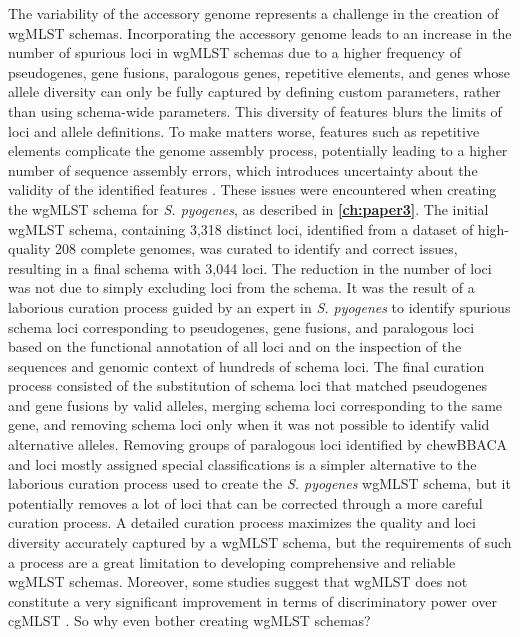 The variability of the accessory genome represents a challenge in the creation of \ac{wgMLST} schemas. Incorporating the accessory genome leads to an increase in the number of spurious loci in \ac{wgMLST} schemas due to a higher frequency of pseudogenes, gene fusions, paralogous genes, repetitive elements, and genes whose allele diversity can only be fully captured by defining custom parameters, rather than using schema-wide parameters. This diversity of features blurs the limits of loci and allele definitions. To make matters worse, features such as repetitive elements complicate the genome assembly process, potentially leading to a higher number of sequence assembly errors, which introduces uncertainty about the validity of the identified features \cite{merda_unraveling_2024, wick_unicycler_2017}. These issues were encountered when creating the \ac{wgMLST} schema for \textit{S. pyogenes}, as described in \textbf{\autoref{ch:paper3}}. The initial \ac{wgMLST} schema, containing 3,318 distinct loci, identified from a dataset of high-quality 208 complete genomes, was curated to identify and correct issues, resulting in a final schema with 3,044 loci. The reduction in the number of loci was not due to simply excluding loci from the schema. It was the result of a laborious curation process guided by an expert in \textit{S. pyogenes} to identify spurious schema loci corresponding to pseudogenes, gene fusions, and paralogous loci based on the functional annotation of all loci and on the inspection of the sequences and genomic context of hundreds of schema loci. The final curation process consisted of the substitution of schema loci that matched pseudogenes and gene fusions by valid alleles, merging schema loci corresponding to the same gene, and removing schema loci only when it was not possible to identify valid alternative alleles. Removing groups of paralogous loci identified by chewBBACA and loci mostly assigned special classifications is a simpler alternative to the laborious curation process used to create the \textit{S. pyogenes} \ac{wgMLST} schema, but it potentially removes a lot of loci that can be corrected through a more careful curation process. A detailed curation process maximizes the quality and loci diversity accurately captured by a \ac{wgMLST} schema, but the requirements of such a process are a great limitation to developing comprehensive and reliable \ac{wgMLST} schemas. Moreover, some studies suggest that \ac{wgMLST} does not constitute a very significant improvement in terms of discriminatory power over \ac{cgMLST} \cite{uelze_typing_2020, henri_assessment_2017, pearce_comparative_2018, vincent_comparison_2018, joseph_evaluation_2023, blanc_comparison_2020, baktash_comparison_nodate, king_comparison_2024}. So why even bother creating \ac{wgMLST} schemas?

